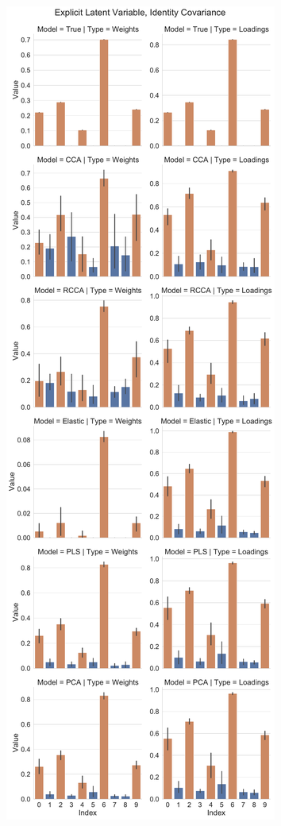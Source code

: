 \begin{figure}
\begin{subfigure}{0.49\linewidth}
\includegraphics[width=\linewidth]{figures/simulated/explicit/Combined_Weights_Loadings_with_Error_Bars_Identity}

\end{subfigure}
\end{figure}
